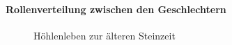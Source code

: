 \documentclass[
  letterpaper,
  DIV=11,
  numbers=noendperiod,
  landscape,
  a4paper,
  geometry:margin=1in]{scrartcl}
\let\oldparagraph\paragraph
\renewcommand{\paragraph}[1]{\oldparagraph{#1}\mbox{}}
\begin{document}
\paragraph{Rollenverteilung zwischen den
Geschlechtern}\label{rollenverteilung-zwischen-den-geschlechtern}

\begin{figure}


\caption{\label{fig-hoehlenleben-zur-aelteren-steinzeit}Höhlenleben zur
älteren Steinzeit}

\end{figure}%
\end{document}
